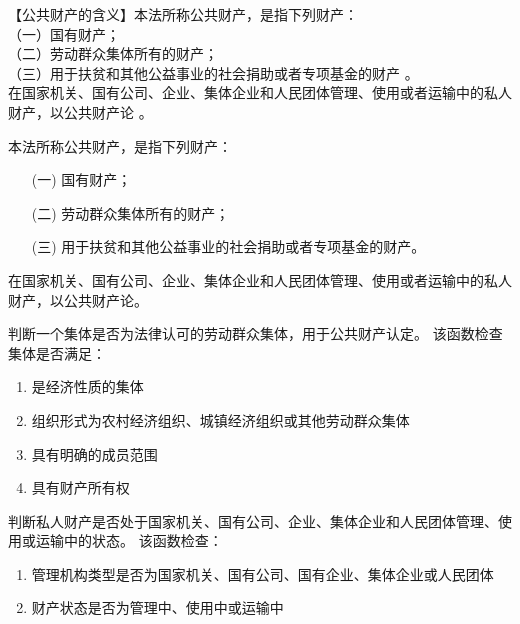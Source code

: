 【公共财产的含义】本法所称公共财产，是指下列财产：\\
（一）国有财产；\\
（二）劳动群众集体所有的财产；\\
（三）用于扶贫和其他公益事业的社会捐助或者专项基金的财产 。\\
在国家机关、国有公司、企业、集体企业和人民团体管理、使用或者运输中的私人财产，以公共财产论 。

\begin{definition}\label{isPublicProperty}
\leanok
{}
本法所称公共财产，是指下列财产：
\begin{enumerate}
\item[(一)] 国有财产；
\item[(二)] 劳动群众集体所有的财产；
\item[(三)] 用于扶贫和其他公益事业的社会捐助或者专项基金的财产。
\end{enumerate}
在国家机关、国有公司、企业、集体企业和人民团体管理、使用或者运输中的私人财产，以公共财产论。
\end{definition}

\begin{definition}\label{isLegalCollective}
\leanok
{}
判断一个集体是否为法律认可的劳动群众集体，用于公共财产认定。
该函数检查集体是否满足：
\begin{enumerate}
\item 是经济性质的集体
\item 组织形式为农村经济组织、城镇经济组织或其他劳动群众集体
\item 具有明确的成员范围
\item 具有财产所有权
\end{enumerate}
\end{definition}

\begin{definition}\label{isInSpecialState}
\leanok
{}
判断私人财产是否处于国家机关、国有公司、企业、集体企业和人民团体管理、使用或运输中的状态。
该函数检查：
\begin{enumerate}
\item 管理机构类型是否为国家机关、国有公司、国有企业、集体企业或人民团体
\item 财产状态是否为管理中、使用中或运输中
\end{enumerate}
\end{definition}

